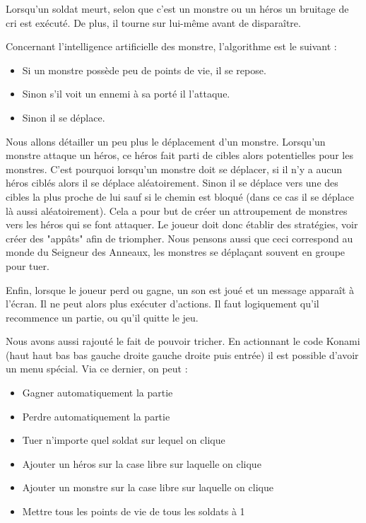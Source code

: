 \documentclass{article}
\begin{document}
Lorsqu'un soldat meurt, selon que c'est un monstre ou un héros un bruitage de cri est exécuté.
De plus, il tourne sur lui-même avant de disparaître.

Concernant l'intelligence artificielle des monstre, l'algorithme est le suivant :
\begin{itemize}
 \item Si un monstre possède peu de points de vie, il se repose.
 \item Sinon s'il voit un ennemi à sa porté il l'attaque.
 \item Sinon il se déplace.
\end{itemize}
Nous allons détailler un peu plus le déplacement d'un monstre.
Lorsqu'un monstre attaque un héros, ce héros fait parti de cibles alors potentielles pour les monstres.
C'est pourquoi lorsqu'un monstre doit se déplacer, si il n'y a aucun héros ciblés alors il se déplace aléatoirement. 
Sinon il se déplace vers une des cibles la plus proche de lui sauf si le chemin est bloqué (dans ce cas il se déplace là aussi aléatoirement). 
Cela a pour but de créer un attroupement de monstres vers les héros qui se font attaquer.
Le joueur doit donc établir des stratégies, voir créer des "appâts" afin de triompher.
Nous pensons aussi que ceci correspond au monde du Seigneur des Anneaux, les monstres se déplaçant souvent en groupe pour tuer.

Enfin, lorsque le joueur perd ou gagne, un son est joué et un message apparaît à l'écran. Il ne peut alors plus exécuter d'actions.
Il faut logiquement qu'il recommence un partie, ou qu'il quitte le jeu.

Nous avons aussi rajouté le fait de pouvoir tricher. 
En actionnant le code Konami (haut haut bas bas gauche droite gauche droite puis entrée) il est possible d'avoir un menu spécial.
Via ce dernier, on peut :
\begin{itemize}
 \item Gagner automatiquement la partie
 \item Perdre automatiquement la partie
 \item Tuer n'importe quel soldat sur lequel on clique
 \item Ajouter un héros sur la case libre sur laquelle on clique
 \item Ajouter un monstre sur la case libre sur laquelle on clique
 \item Mettre tous les points de vie de tous les soldats à 1
\end{itemize}
\end{document}
